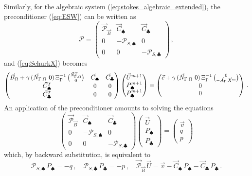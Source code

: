 Similarly, for the algebraic system (\ref{eq:stokes_algebraic_extended}),
the preconditioner (\ref{eq:ESW}) can be written as
\begin{equation} \label{eq:ESWP1P0}
\mathcal{P} = \begin{pmatrix}
\vec{\mathcal{P}}_{\vec B} & \vec C_\spadesuit & \vec C_\clubsuit \\
0 & -\mathcal{P}_{S,\spadesuit} & 0 \\
0 & 0 &-\mathcal{P}_{S,\clubsuit}
\end{pmatrix}\,,
\end{equation}
and (\ref{eq:SchurkX}) becomes
\begin{subequations}
\begin{equation} \label{eq:SchurkXP1P0}
\begin{pmatrix}
\vec B_\Omega + \gamma\,(\Nbulk \ 0)\,\Xi_\Gamma^{-1}\,\binom{\NbulkT}{0} &
\vec C_\spadesuit & \vec C_\clubsuit \\
\vec C^T_\spadesuit & 0 & 0 \\
\vec C^T_\clubsuit & 0 & 0 \\
\end{pmatrix}
\begin{pmatrix}
\vec U^{m+1} \\
P^{m+1}_\spadesuit \\
P^{m+1}_\clubsuit
\end{pmatrix}
= \begin{pmatrix}
\vec c+\gamma\,(\Nbulk \ 0)\,
\Xi_\Gamma^{-1}\,\binom{0}{-\vec{A}_\Gamma\,\vec{X}^{m}} \\
0 \\
0
\end{pmatrix}\,.
\end{equation}
\end{subequations}
An application of the preconditioner amounts to solving the equations
\begin{equation*}
\begin{pmatrix}
\vec{\mathcal{P}}_{\vec B} & \vec C_\spadesuit & \vec C_\clubsuit \\
0 & -\mathcal{P}_{S,\spadesuit} & 0 \\
0 & 0 &-\mathcal{P}_{S,\clubsuit}
\end{pmatrix}
\begin{pmatrix}
\vec U \\
P_\spadesuit \\
P_\clubsuit
\end{pmatrix}
=
\begin{pmatrix}
\vec v \\
q \\
p
\end{pmatrix}
\end{equation*}
which, by backward substitution, is equivalent to
\begin{equation}\label{eq:blocksolutionP1P0}
\mathcal{P}_{S,\spadesuit}\,P_\spadesuit =
-q\,,\quad \mathcal{P}_{S,\clubsuit}\,P_\clubsuit =
-p\,,\quad \vec{\mathcal{P}}_{\vec B}\,\vec U =
\vec v - \vec C_\spadesuit\,P_\spadesuit - \vec C_\clubsuit\,P_\clubsuit\,.
\end{equation}

